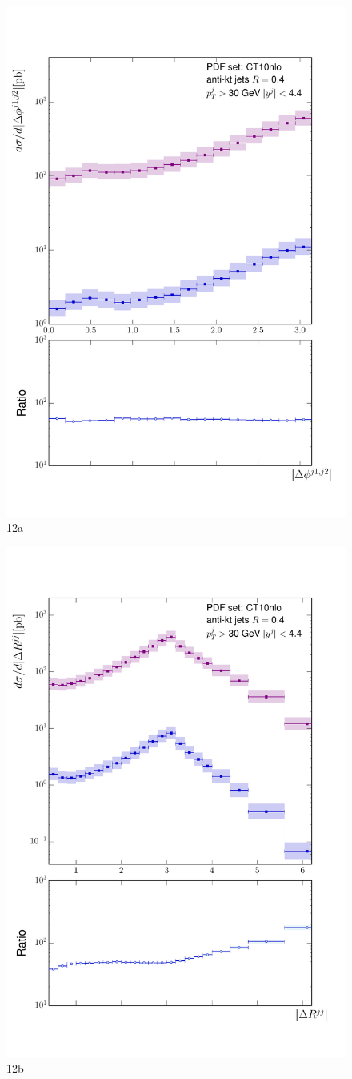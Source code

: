 	\begin{figure}[h]
		\centering
		\includegraphics[width=0.8\linewidth]{Figures/ATLAS_Z_100TeV_12a.pdf}
		\caption{12a}
		\label{fig:emissionsites}
	\end{figure}

	\begin{figure}[h]
		\centering
		\includegraphics[width=0.8\linewidth]{Figures/ATLAS_Z_100TeV_12b.pdf}
		\caption{12b}
		\label{fig:emissionsites}
	\end{figure}

